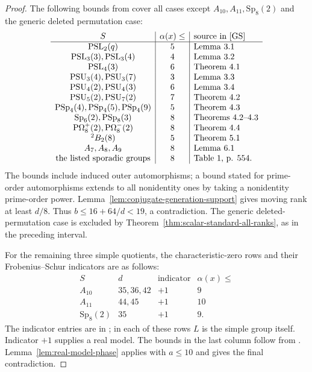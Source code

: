 \documentclass[11pt]{article}
\theoremstyle{definition}
\theoremstyle{remark}
\begin{document}
\begin{proof}
The following bounds from \cite{GS} cover all cases except
$A_{10},A_{11},\mathrm{Sp}_8(2)$ and the generic deleted
permutation case:
\[
\begin{array}{c|c|l}
 S&\alpha(x)\leq&\text{source in \cite{GS}}\\ \hline
 \mathrm{PSL}_2(q)&5&\text{Lemma 3.1}\\
 \mathrm{PSL}_3(3),\mathrm{PSL}_3(4)&4&\text{Lemma 3.2}\\
 \mathrm{PSL}_4(3)&6&\text{Theorem 4.1}\\
 \mathrm{PSU}_3(4),\mathrm{PSU}_3(7)&3&\text{Lemma 3.3}\\
 \mathrm{PSU}_4(2),\mathrm{PSU}_4(3)&6&\text{Lemma 3.4}\\
 \mathrm{PSU}_5(2),\mathrm{PSU}_7(2)&7&\text{Theorem 4.2}\\
 \mathrm{PSp}_4(4),\mathrm{PSp}_4(5),\mathrm{PSp}_4(9)&5&\text{Theorem 4.3}\\
 \mathrm{Sp}_6(2),\mathrm{PSp}_8(3)&8&\text{Theorems 4.2--4.3}\\
 \mathrm{P}\Omega_8^+(2),\mathrm{P}\Omega_8^-(2)&8&\text{Theorem 4.4}\\
 {}^2B_2(8)&5&\text{Theorem 5.1}\\
 A_7,A_8,A_9&8&\text{Lemma 6.1}\\
 \text{the listed sporadic groups}&8&\text{Table 1, p. 554}.
\end{array}
\]
The bounds include induced outer automorphisms; a bound stated
for prime-order automorphisms extends to all nonidentity ones
by taking a nonidentity prime-order power.
Lemma~\ref{lem:conjugate-generation-support} gives moving rank
at least $d/8$.  Thus
$b\leq16+64/d<19$, a contradiction.
The generic deleted-permutation case is excluded by
Theorem~\ref{thm:scalar-standard-all-ranks}, as in the preceding
interval.

For the remaining three simple quotients, the
characteristic-zero rows and their Frobenius--Schur indicators
are as follows:
\[
\begin{array}{c|c|c|c}
 S&d&\text{indicator}&\alpha(x)\leq\\ \hline
 A_{10}&35,36,42&+1&9\\
 A_{11}&44,45&+1&10\\
 \mathrm{Sp}_8(2)&35&+1&9.
\end{array}
\]
The indicator entries are in
\cite[Table~2, pp.~103--105]{HissMalleCorrection}; in each of
these rows $L$ is the simple group itself.  Indicator $+1$
supplies a real model.  The bounds in the last column follow
from \cite[Lemma~6.1 and Theorem~4.2]{GS}.
Lemma~\ref{lem:real-model-phase} applies with $a\leq10$
and gives the final contradiction.
\end{proof}
\end{document}
